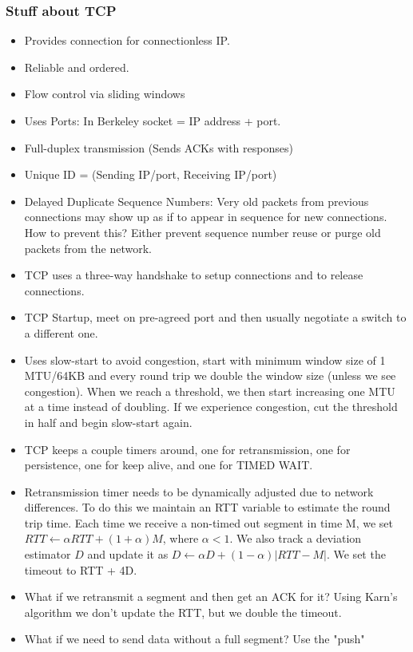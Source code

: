 \documentclass{scrartcl}
\begin{document}
\subsubsection*{Stuff about TCP}
\begin{itemize}
\item Provides connection for connectionless IP.
\item Reliable and ordered.
\item Flow control via sliding windows
\item Uses Ports: In Berkeley socket = IP address + port.
\item Full-duplex transmission (Sends ACKs with responses)
\item Unique ID = (Sending IP/port, Receiving IP/port)
\item Delayed Duplicate Sequence Numbers: Very old packets from previous
connections may show up as if to appear in sequence for new connections.
How to prevent this? Either prevent sequence number reuse or purge old
packets from the network.
\item TCP uses a three-way handshake to setup connections and to release
connections.
\item TCP Startup, meet on pre-agreed port and then usually negotiate a 
switch to a different one.
\item Uses slow-start to avoid congestion, start with minimum window size
of 1 MTU/64KB and every round trip we double the window size (unless
we see congestion). When we reach a threshold, we then start increasing
one MTU at a time instead of doubling. If we experience congestion, cut 
the threshold in half and begin slow-start again.
\item TCP keeps a couple timers around, one for retransmission, one for
persistence, one for keep alive, and one for TIMED WAIT.
\item Retransmission timer needs to be dynamically adjusted due to 
network differences. To do this we maintain an RTT variable to estimate the
round trip time. Each time we receive a non-timed out segment in time M,
we set $RTT \leftarrow \alpha RTT + (1+\alpha)M$, where $\alpha < 1$. 
We also track a deviation estimator $D$ and update it as $D \leftarrow 
\alpha D + (1 - \alpha)|RTT - M|$. We set the timeout to RTT + 4D.
\item What if we retransmit a segment and then get an ACK for it? Using
Karn's algorithm we don't update the RTT, but we double the timeout.
\item What if we need to send data without a full segment? Use the "push"

\end{itemize}
\end{document}
